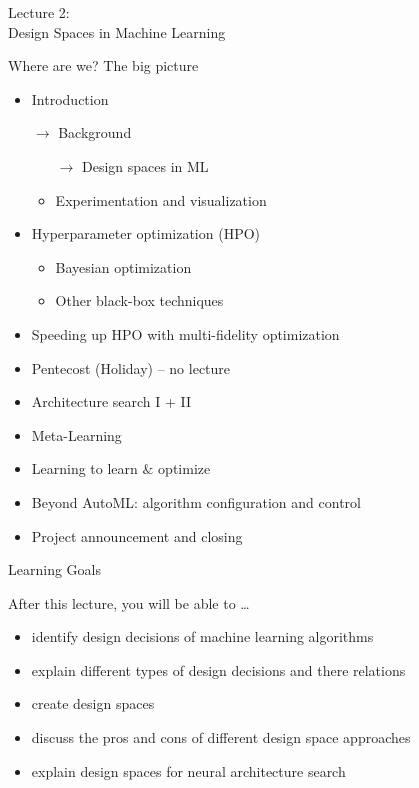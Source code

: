\begin{frame}[c]{}

\centering
\huge
Lecture 2:\\
Design Spaces in Machine Learning
\end{frame}
\begin{frame}[c]{Where are we? The big picture}

\begin{itemize}
	\item Introduction
	\item[$\to$] Background
	\begin{itemize}
		\item[$\to$] Design spaces in ML
		\item Experimentation and visualization
	\end{itemize}
	\item Hyperparameter optimization (HPO)
	\begin{itemize}
	  \item Bayesian optimization
	  \item Other black-box techniques
	\end{itemize}
	\item Speeding up HPO with multi-fidelity optimization
	\item Pentecost (Holiday) -- no lecture
	\item Architecture search I + II
	\item Meta-Learning
	\item Learning to learn $\&$ optimize
	\item Beyond AutoML: algorithm configuration and control
	\item Project announcement and closing
\end{itemize}


\end{frame}
\begin{frame}[c]{Learning Goals}

After this lecture, you will be able to \ldots

\begin{itemize}
  \item identify design decisions of machine learning algorithms
  \item explain different types of design decisions and there relations
  \item create design spaces
  \item discuss the pros and cons of different design space approaches
  \item explain design spaces for neural architecture search
\end{itemize}

\end{frame}
